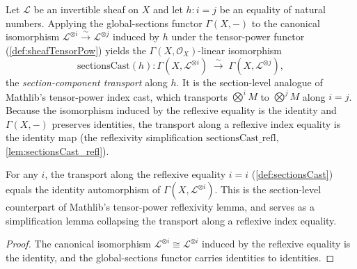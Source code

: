 \begin{definition}
  \label{def:sectionsCast}
  Let \(\mathcal{L}\) be an invertible sheaf on \(X\) and let \(h : i = j\) be an
  equality of natural numbers. Applying the global-sections functor
  \(\Gamma(X,-)\) to the canonical isomorphism
  \(\mathcal{L}^{\otimes i} \xrightarrow{\sim} \mathcal{L}^{\otimes j}\) induced by
  \(h\) under the tensor-power functor (\cref{def:sheafTensorPow}) yields the
  \(\Gamma(X,\mathcal{O}_X)\)-linear isomorphism
  \[
    \mathrm{sectionsCast}(h) :
    \Gamma(X, \mathcal{L}^{\otimes i}) \;\xrightarrow{\ \sim\ }\;
    \Gamma(X, \mathcal{L}^{\otimes j}),
  \]
  the \emph{section-component transport} along \(h\). It is the section-level
  analogue of Mathlib's tensor-power index cast, which transports
  \(\bigotimes^{i} M\) to \(\bigotimes^{j} M\) along \(i = j\). Because the
  isomorphism induced by the reflexive equality is the identity and
  \(\Gamma(X,-)\) preserves identities, the transport along a reflexive index
  equality is the identity map (the reflexivity simplification
  \(\mathrm{sectionsCast\_refl}\), \cref{lem:sectionsCast_refl}).
\end{definition}

\begin{lemma}
  \label{lem:sectionsCast_refl}
  For any \(i\), the transport along the reflexive equality \(i = i\)
  (\cref{def:sectionsCast}) equals the identity automorphism of
  \(\Gamma(X, \mathcal{L}^{\otimes i})\). This is the section-level counterpart of
  Mathlib's tensor-power reflexivity lemma, and serves as a simplification lemma
  collapsing the transport along a reflexive index equality.
\end{lemma}

\begin{proof}


  The canonical isomorphism
  \(\mathcal{L}^{\otimes i} \cong \mathcal{L}^{\otimes i}\) induced by the
  reflexive equality is the identity, and the global-sections functor carries
  identities to identities.
\end{proof}

